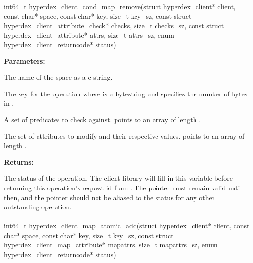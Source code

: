 \paragraph{}
\label{api:c:cond_map_remove}
\begin{ccode}
int64_t hyperdex_client_cond_map_remove(struct hyperdex_client* client,
        const char* space,
        const char* key, size_t key_sz,
        const struct hyperdex_client_attribute_check* checks, size_t checks_sz,
        const struct hyperdex_client_attribute* attrs, size_t attrs_sz,
        enum hyperdex_client_returncode* status);
\end{ccode}
\funcdesc 

\noindent\textbf{Parameters:}
\begin{description}[labelindent=\widthof{{\code{checks}, \code{checks\_sz}}},leftmargin=*,noitemsep,nolistsep,align=right]
\item[\code{space}] The name of the space as a c-string.
\item[\code{key}, \code{key\_sz}] The key for the operation where  is a bytestring and  specifies the number of bytes in .
\item[\code{checks}, \code{checks\_sz}] A set of predicates to check against.   points to an array of length .
\item[\code{attrs}, \code{attrs\_sz}] The set of attributes to modify and their respective values.   points to an array of length .
\end{description}

\noindent\textbf{Returns:}
\begin{description}[labelindent=\widthof{{\code{status}}},leftmargin=*,noitemsep,nolistsep,align=right]
\item[\code{status}] The status of the operation.  The client library will fill in this variable before returning this operation's request id from .  The pointer must remain valid until then, and the pointer should not be aliased to the status for any other outstanding operation.
\end{description}

\paragraph{}
\label{api:c:map_atomic_add}
\begin{ccode}
int64_t hyperdex_client_map_atomic_add(struct hyperdex_client* client,
        const char* space,
        const char* key, size_t key_sz,
        const struct hyperdex_client_map_attribute* mapattrs, size_t mapattrs_sz,
        enum hyperdex_client_returncode* status);
\end{ccode}
\funcdesc 

